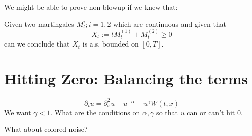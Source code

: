 \documentclass[12pt]{article}
\numberwithin{equation}{section}
\begin{document}
We might be able to prove non-blowup if we knew that:

Given two martingales $M^{i}_t; i=1,2$ which are continuous and given that
\begin{equation*}
X_t:= tM^{(1)}_t+M^{(2)}_t\geq0
\end{equation*}
can we conclude that $X_t$ is a.s. bounded on $[0,T]$.  

\section{Hitting Zero: Balancing the terms}

\begin{equation*}
\partial_tu=\partial_x^2u+u^{-\alpha}+u^{\gamma}\dot{W}(t,x)
\end{equation*}
We want $\gamma<1$.  What are the conditions on $\alpha,\gamma$ so that $u$ 
can or can't hit 0.

What about colored noise?
\end{document}
